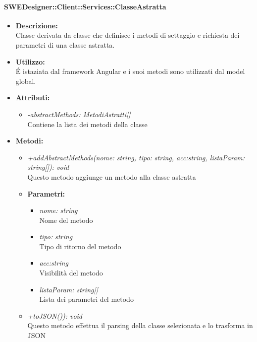           	\paragraph{SWEDesigner::Client::Services::ClasseAstratta}
				\begin{itemize}
          			\item \textbf{Descrizione:}\\
          			Classe derivata da classe che definisce i metodi di settaggio e richiesta dei parametri di una classe astratta.
          			\item \textbf{Utilizzo:}\\
          			É istaziata dal framework Angular e i suoi metodi sono utilizzati dal model global.
          			\item \textbf{Attributi:}\\
          			\begin{itemize}
          				\item \emph{-abstractMethods: MetodiAstratti[]}\\
            			Contiene la lista dei metodi della classe
          			\end{itemize}
          			\item \textbf{Metodi:}\\
          			\begin{itemize}
          				\item \emph{+addAbstractMethods(nome: string, tipo: string, acc:string, listaParam: string[]): void}\\
          				Questo metodo aggiunge un metodo alla classe astratta
          				\item \textbf{Parametri:}\\
            				\begin{itemize}
            					\item \emph{nome: string}\\
            					Nome del metodo
            					\item \emph{tipo: string}\\
            					Tipo di ritorno del metodo
            					\item \emph{acc:string}\\
            					Visibilità del metodo
            					\item \emph{listaParam: string[]}\\
            					Lista dei parametri del metodo
            				\end{itemize}
          				\item \emph{+toJSON()): void}\\
          				Questo metodo effettua il parsing della classe selezionata e lo trasforma in JSON
          			\end{itemize}
          		\end{itemize}
